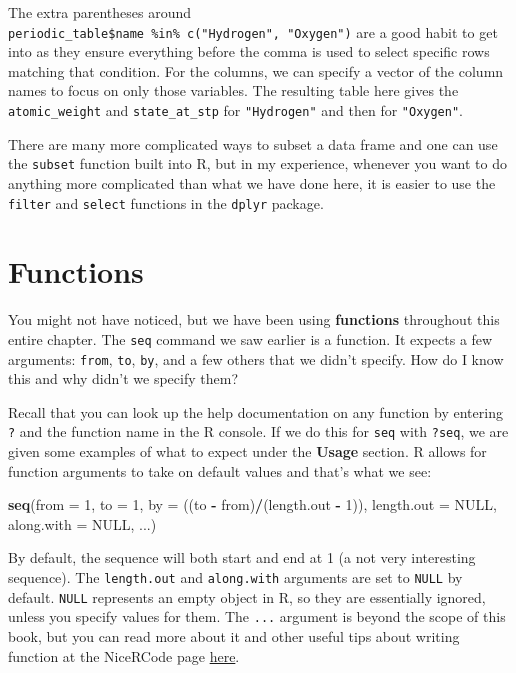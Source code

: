 \documentclass[]{tufte-book}
\newenvironment{Shaded}{\begin{snugshade}}{\end{snugshade}}
\newcommand{\DataTypeTok}[1]{\textcolor[rgb]{0.13,0.29,0.53}{#1}}
\newcommand{\DecValTok}[1]{\textcolor[rgb]{0.00,0.00,0.81}{#1}}
\newcommand{\KeywordTok}[1]{\textcolor[rgb]{0.13,0.29,0.53}{\textbf{#1}}}
\newcommand{\NormalTok}[1]{#1}
\newcommand{\OperatorTok}[1]{\textcolor[rgb]{0.81,0.36,0.00}{\textbf{#1}}}
\newcommand{\OtherTok}[1]{\textcolor[rgb]{0.56,0.35,0.01}{#1}}
\newcommand{\StringTok}[1]{\textcolor[rgb]{0.31,0.60,0.02}{#1}}
\begin{document}
The extra parentheses around \texttt{periodic\_table\$name\ \%in\%\ c("Hydrogen",\ "Oxygen")} are a good habit to get into as they ensure everything before the comma is used to select specific rows matching that condition. For the columns, we can specify a vector of the column names to focus on only those variables. The resulting table here gives the \texttt{atomic\_weight} and \texttt{state\_at\_stp} for \texttt{"Hydrogen"} and then for \texttt{"Oxygen"}.

There are many more complicated ways to subset a data frame and one can use the \texttt{subset} function built into R, but in my experience, whenever you want to do anything more complicated than what we have done here, it is easier to use the \texttt{filter} and \texttt{select} functions in the \texttt{dplyr} package.

\hypertarget{functions}{%
\section{Functions}\label{functions}}

You might not have noticed, but we have been using \textbf{functions} throughout this entire chapter. The \texttt{seq} command we saw earlier is a function. It expects a few arguments: \texttt{from}, \texttt{to}, \texttt{by}, and a few others that we didn't specify. How do I know this and why didn't we specify them?

Recall that you can look up the help documentation on any function by entering \texttt{?} and the function name in the R console. If we do this for \texttt{seq} with \texttt{?seq}, we are given some examples of what to expect under the \textbf{Usage} section. R allows for function arguments to take on default values and that's what we see:

\begin{Shaded}
\begin{Highlighting}[]
\KeywordTok{seq}\NormalTok{(}\DataTypeTok{from =} \DecValTok{1}\NormalTok{, }\DataTypeTok{to =} \DecValTok{1}\NormalTok{, }\DataTypeTok{by =}\NormalTok{ ((to }\OperatorTok{{-}}\StringTok{ }\NormalTok{from)}\OperatorTok{/}\NormalTok{(length.out }\OperatorTok{{-}}\StringTok{ }\DecValTok{1}\NormalTok{)),}
  \DataTypeTok{length.out =} \OtherTok{NULL}\NormalTok{, }\DataTypeTok{along.with =} \OtherTok{NULL}\NormalTok{, ...)}
\end{Highlighting}
\end{Shaded}

By default, the sequence will both start and end at 1 (a not very interesting sequence). The \texttt{length.out} and \texttt{along.with} arguments are set to \texttt{NULL} by default. \texttt{NULL} represents an empty object in R, so they are essentially ignored, unless you specify values for them. The \texttt{...} argument is beyond the scope of this book, but you can read more about it and other useful tips about writing function at the NiceRCode page \href{http://nicercode.github.io/guides/functions/}{here}.
\end{document}
